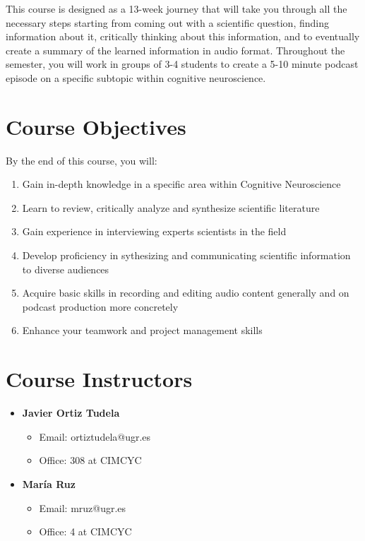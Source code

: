 \documentclass[
  letterpaper,
  DIV=11,
  numbers=noendperiod]{scrreprt}
\providecommand{\tightlist}{%
  \setlength{\itemsep}{0pt}\setlength{\parskip}{0pt}}\usepackage{longtable,booktabs,array}
\begin{document}
This course is designed as a 13-week journey that will take you through
all the necessary steps starting from coming out with a scientific
question, finding information about it, critically thinking about this
information, and to eventually create a summary of the learned
information in audio format. Throughout the semester, you will work in
groups of 3-4 students to create a 5-10 minute podcast episode on a
specific subtopic within cognitive neuroscience.

\section{Course Objectives}\label{course-objectives}

By the end of this course, you will:

\begin{enumerate}
\def\labelenumi{\arabic{enumi}.}
\tightlist
\item
  Gain in-depth knowledge in a specific area within Cognitive
  Neuroscience
\item
  Learn to review, critically analyze and synthesize scientific
  literature
\item
  Gain experience in interviewing experts scientists in the field
\item
  Develop proficiency in sythesizing and communicating scientific
  information to diverse audiences
\item
  Acquire basic skills in recording and editing audio content generally
  and on podcast production more concretely
\item
  Enhance your teamwork and project management skills
\end{enumerate}

\section{Course Instructors}\label{course-instructors}

\begin{itemize}
\tightlist
\item
  \textbf{Javier Ortiz Tudela}

  \begin{itemize}
  \tightlist
  \item
    Email: ortiztudela@ugr.es
  \item
    Office: 308 at CIMCYC
  \end{itemize}
\item
  \textbf{María Ruz}

  \begin{itemize}
  \tightlist
  \item
    Email: mruz@ugr.es
  \item
    Office: 4 at CIMCYC
  \end{itemize}
\end{itemize}
\end{document}
